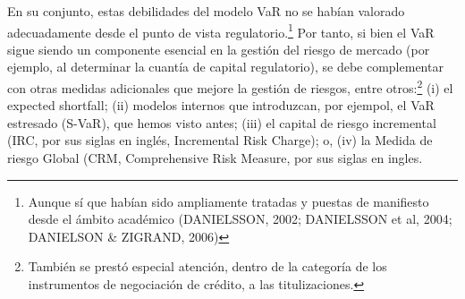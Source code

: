 \documentclass[10pt,a4paper]{article}
\begin{document}
En su conjunto, estas debilidades del modelo VaR no se habían valorado adecuadamente desde el punto de vista regulatorio.\footnote{%
    Aunque sí que habían sido ampliamente tratadas y puestas de manifiesto desde el ámbito académico (DANIELSSON, 2002; DANIELSSON et al, 2004; DANIELSON \& ZIGRAND, 2006)
} Por tanto, si bien el VaR sigue siendo un componente esencial en la gestión del riesgo de mercado (por ejemplo, al determinar la cuantía de capital regulatorio), se debe complementar con otras medidas adicionales que mejore la gestión de riesgos, entre otros:\footnote{%
    También se prestó especial atención, dentro de la categoría de los instrumentos de negociación de crédito, a las titulizaciones.
} (i) el expected shortfall; (ii) modelos internos que introduzcan, por ejempol, el VaR estresado (S-VaR), que hemos visto antes; (iii) el capital de riesgo incremental (IRC, por sus siglas en inglés, Incremental Risk Charge); o, (iv) la Medida de riesgo Global (CRM, Comprehensive Risk Measure, por sus siglas en ingles.
\end{document}
